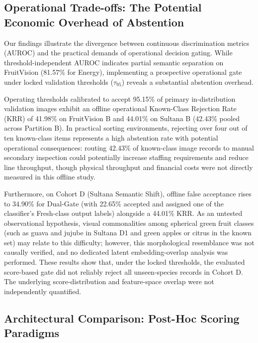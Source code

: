 \vspace*{-7pt}\subsection{Operational Trade-offs: The Potential Economic Overhead of Abstention}
\vspace*{-2pt}
\label{sec:discussion_operational_tradeoffs}

Our findings illustrate the divergence between continuous discrimination metrics (AUROC) and the practical demands of operational decision gating. While threshold-independent AUROC indicates partial semantic separation on FruitVision (81.57\% for Energy), implementing a prospective operational gate under locked validation thresholds ($\tau_{95}$) reveals a substantial abstention overhead.

Operating thresholds calibrated to accept 95.15\% of primary in-distribution validation images exhibit an offline operational Known-Class Rejection Rate (KRR) of 41.98\% on FruitVision B and 44.01\% on Sultana B (42.43\% pooled across Partition B). In practical sorting environments, rejecting over four out of ten known-class items represents a high abstention rate with potential operational consequences: routing 42.43\% of known-class image records to manual secondary inspection could potentially increase staffing requirements and reduce line throughput, though physical throughput and financial costs were not directly measured in this offline study.

Furthermore, on Cohort D (Sultana Semantic Shift), offline false acceptance rises to 34.90\% for Dual-Gate (with 22.65\% accepted and assigned one of the classifier's Fresh-class output labels) alongside a 44.01\% KRR. As an untested observational hypothesis, visual commonalities among spherical green fruit classes (such as guava and jujube in Sultana D1 and green apples or citrus in the known set) may relate to this difficulty; however, this morphological resemblance was not causally verified, and no dedicated latent embedding-overlap analysis was performed. These results show that, under the locked thresholds, the evaluated score-based gate did not reliably reject all unseen-species records in Cohort D. The underlying score-distribution and feature-space overlap were not independently quantified.

\vspace*{-7pt}\subsection{Architectural Comparison: Post-Hoc Scoring Paradigms}
\vspace*{-2pt}
\label{sec:discussion_architectural_comparison}

